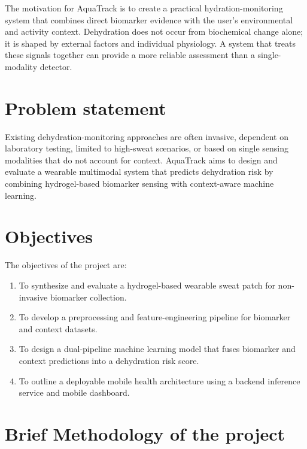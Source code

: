 The motivation for AquaTrack is to create a practical hydration-monitoring system that combines direct biomarker evidence with the user's environmental and activity context. Dehydration does not occur from biochemical change alone; it is shaped by external factors and individual physiology. A system that treats these signals together can provide a more reliable assessment than a single-modality detector.

\section[Problem statement]{\textbf{Problem statement}}

Existing dehydration-monitoring approaches are often invasive, dependent on laboratory testing, limited to high-sweat scenarios, or based on single sensing modalities that do not account for context. AquaTrack aims to design and evaluate a wearable multimodal system that predicts dehydration risk by combining hydrogel-based biomarker sensing with context-aware machine learning.

\section[Objectives]{\textbf{Objectives}}

The objectives of the project are:
\begin{enumerate}
\item To synthesize and evaluate a hydrogel-based wearable sweat patch for non-invasive biomarker collection.
\item To develop a preprocessing and feature-engineering pipeline for biomarker and context datasets.
\item To design a dual-pipeline machine learning model that fuses biomarker and context predictions into a dehydration risk score.
\item To outline a deployable mobile health architecture using a backend inference service and mobile dashboard.
\end{enumerate}

\section[Brief Methodology of the project]{\textbf{Brief Methodology of the project}}


